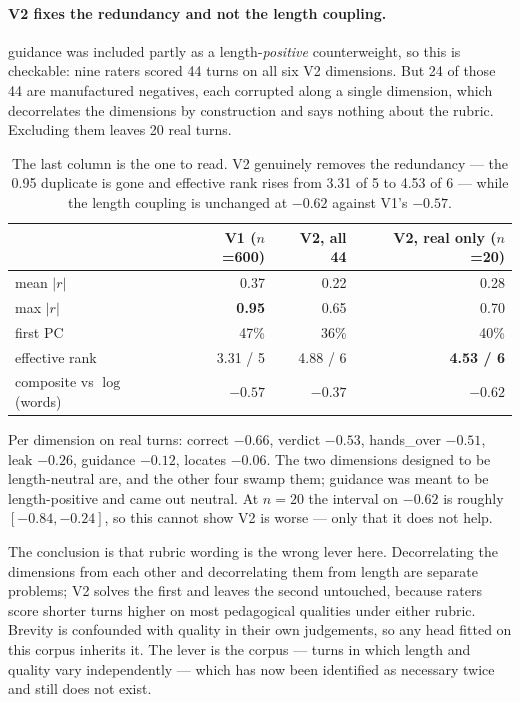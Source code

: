 \documentclass[11pt]{article}
\newcommand{\qual}[1]{\textsf{#1}}
\begin{document}
\paragraph{V2 fixes the redundancy and not the length coupling.} \qual{guidance} was included partly as
a length-\emph{positive} counterweight, so this is checkable: nine raters scored 44 turns on all six V2
dimensions. But 24 of those 44 are manufactured negatives, each corrupted along a single dimension,
which decorrelates the dimensions by construction and says nothing about the rubric. Excluding them
leaves 20 real turns.

\begin{table}[h]
\centering
\begin{tabular}{lrrr}
\toprule
& \textbf{V1 ($n$=600)} & \textbf{V2, all 44} & \textbf{V2, real only ($n$=20)} \\
\midrule
mean $|r|$ & 0.37 & 0.22 & 0.28 \\
max $|r|$ & \textbf{0.95} & 0.65 & 0.70 \\
first PC & 47\% & 36\% & 40\% \\
effective rank & 3.31 / 5 & 4.88 / 6 & \textbf{4.53 / 6} \\
composite vs $\log$(words) & \textbf{$-0.57$} & $-0.37$ & \textbf{$-0.62$} \\
\bottomrule
\end{tabular}
\caption{The last column is the one to read. V2 genuinely removes the redundancy --- the 0.95 duplicate
is gone and effective rank rises from 3.31 of 5 to 4.53 of 6 --- while the length coupling is
unchanged at $-0.62$ against V1's $-0.57$.}
\label{tab:v2corr}
\end{table}

Per dimension on real turns: \qual{correct} $-0.66$, \qual{verdict} $-0.53$, \qual{hands\_over}
$-0.51$, \qual{leak} $-0.26$, \qual{guidance} $-0.12$, \qual{locates} $-0.06$. The two dimensions
designed to be length-neutral are, and the other four swamp them; \qual{guidance} was meant to be
length-positive and came out neutral. At $n=20$ the interval on $-0.62$ is roughly $[-0.84, -0.24]$, so
this cannot show V2 is worse --- only that it does not help.

The conclusion is that rubric wording is the wrong lever here. Decorrelating the dimensions from each
other and decorrelating them from length are separate problems; V2 solves the first and leaves the
second untouched, because raters score shorter turns higher on most pedagogical qualities under either
rubric. Brevity is confounded with quality in their own judgements, so any head fitted on this corpus
inherits it. The lever is the corpus --- turns in which length and quality vary independently --- which
has now been identified as necessary twice and still does not exist.
\end{document}
